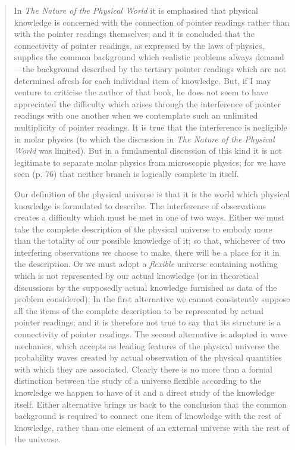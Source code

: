 \begin{quote}
    In \emph{The Nature of the Physical World} it is emphasised that physical knowledge is concerned with the connection of pointer readings rather than with the pointer readings themselves; and it is concluded that the connectivity of pointer readings, as expressed by the laws of physics, supplies the common background which realistic problems always demand---the background described by the tertiary pointer readings which are not determined afresh for each individual item of knowledge.  But, if I may venture to criticise the author of that book, he does not seem to have appreciated the difficulty which arises through the interference of pointer readings with one another when we contemplate such an unlimited multiplicity of pointer readings.  It is true that the interference is negligible in molar physics (to which the discussion in \emph{The Nature of the Physical World} was limited).  But in a fundamental discussion of this kind it is not legitimate to separate molar physics from microscopic physics; for we have seen (p. 76) that neither branch is logically complete in itself.  
    
    Our definition of the physical universe is that it is the world which physical knowledge is formulated to describe.  The interference of observations creates a difficulty which must be met in one of two ways.  Either we must take the complete description of the physical universe to embody more than the totality of our possible knowledge of it; so that, whichever of two interfering observations we choose to make, there will be a place for it in the description.  Or we must adopt a \emph{flexible} universe containing nothing which is not represented by our actual knowledge (or in theoretical discussions by the supposedly actual knowledge furnished as data of the problem considered).  In the first alternative we cannot consistently suppose all the items of the complete description to be represented by actual pointer readings; and it is therefore not true to say that its structure is a connectivity of pointer readings.  The second alternative is adopted in wave mechanics, which accepts as leading features of the physical universe the probability waves created by actual observation of the physical quantities with which they are associated.  Clearly there is no more than a formal distinction between the study of a universe flexible according to the knowledge we happen to have of it and a direct study of the knowledge itself.  Either alternative brings us back to the conclusion that the common background is required to connect one item of knowledge with the rest of knowledge, rather than one element of an external universe with the rest of the universe.
    \citep[p. 100-102]{Eddington1939}
\end{quote}

